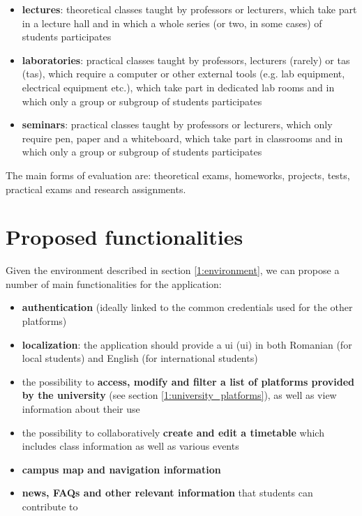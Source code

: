     \begin{itemize}
        \item \textbf{lectures}: theoretical classes taught by professors or lecturers, which take part in a lecture hall and in which a whole series (or two, in some cases) of students participates
        \item \textbf{laboratories}: practical classes taught by professors, lecturers (rarely) or \acrshort{ta}s (\acrlong{ta}s), which require a computer or other external tools (e.g. lab equipment, electrical equipment etc.), which take part in dedicated lab rooms and in which only a group or subgroup of students participates
        \item \textbf{seminars}: practical classes taught by professors or lecturers, which only require pen, paper and a whiteboard, which take part in classrooms and in which only a group or subgroup of students participates
    \end{itemize}
    
    The main forms of evaluation are: theoretical exams, homeworks, projects, tests, practical exams and research assignments.
        
\section{Proposed functionalities} \label{1:functionalities}

    Given the environment described in section \ref{1:environment}, we can propose a number of main functionalities for the application:
    
    \begin{itemize}
        \item \textbf{authentication} (ideally linked to the common credentials used for the other platforms)
        \item \textbf{localization}: the application should provide a \acrshort{ui} (\acrlong{ui}) in both Romanian (for local students) and English (for international students)
        \item the possibility to \textbf{access, modify and filter a list of platforms provided by the university} (see section \ref{1:university_platforms}), as well as view information about their use
        \item the possibility to collaboratively \textbf{create and edit a timetable} which includes class information as well as various events
        \item \textbf{campus map and navigation information}
        \item \textbf{news, FAQs and other relevant information} that students can contribute to
    \end{itemize}

